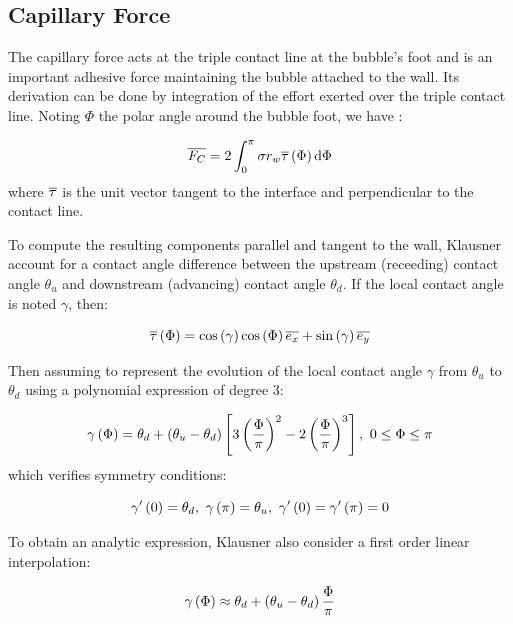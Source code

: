 \subsection{Capillary Force}

The capillary force acts at the triple contact line at the bubble's foot and is an important adhesive force maintaining the bubble attached to the wall. Its derivation can be done by integration of the effort exerted over the triple contact line. Noting $\Phi$ the polar angle around the bubble foot, we have :


\begin{equation}
\overline{F_{C}} = 2 \int_{0}^{\pi} \sigma r_{w} \overline{\tau}\left( \Phi \right) \mathrm{d}\Phi
\end{equation}
where $\overline{\tau}$ is the unit vector tangent to the interface and perpendicular to the contact line.

To compute the resulting components parallel and tangent to the wall, Klausner \etal \cite{klausner_vapor_1993} account for a contact angle difference between the upstream (receeding) contact angle $\theta_{u}$ and downstream (advancing) contact angle $\theta_{d}$. If the local contact angle is noted $\gamma$, then:

\begin{equation}
\overline{\tau}\left( \Phi \right) = \mathrm{cos}\left( \gamma \right) \mathrm{cos}\left( \Phi \right) \overline{e_{x}} + \mathrm{sin}\left( \gamma \right) \overline{e_{y}}
\end{equation}

Then assuming to represent the evolution of the local contact angle $\gamma$ from $\theta_{u}$ to $\theta_{d}$ using a polynomial expression of degree 3:


\begin{equation}
\gamma\left( \Phi \right) = \theta_{d} + \left( \theta_{u} - \theta_{d} \right) \left[ 3\left( \frac{\Phi}{ \pi} \right)^{2} - 2\left( \frac{\Phi}{\pi} \right)^{3} \right],\ 0 \leq \Phi \leq \pi
\label{eq:forces_klausner_poly_deg3}
\end{equation}
which verifies symmetry conditions:

\begin{equation}
\gamma'\parth{0} = \theta_{d},\ \gamma\parth{\pi} = \theta_{u},\ \gamma'\parth{0}=\gamma'\parth{\pi}=0
\end{equation}

To obtain an analytic expression, Klausner \etal also consider a first order linear interpolation:

\begin{equation}
\gamma\left( \Phi \right) \approx \theta_{d} + \left( \theta_{u}-\theta_{d} \right)\frac{\Phi}{\pi}
\end{equation}

